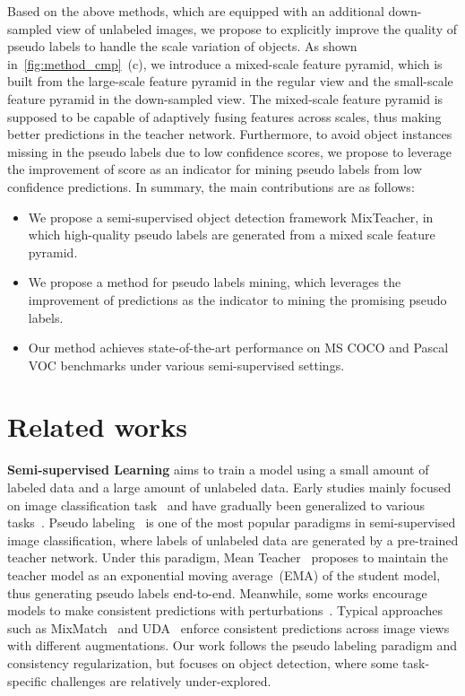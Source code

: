 \documentclass[10pt,twocolumn,letterpaper]{article}
\begin{document}
Based on the above methods, which are equipped with an additional down-sampled view of unlabeled images, we propose to explicitly improve the quality of pseudo labels to handle the scale variation of objects. As shown in~\cref{fig:method_cmp}~(c), we introduce a mixed-scale feature pyramid, which is built from the large-scale feature pyramid in the regular view and the small-scale feature pyramid in the down-sampled view. The mixed-scale feature pyramid is supposed to be capable of adaptively fusing features across scales, thus making better predictions in the teacher network. Furthermore, to avoid object instances missing in the pseudo labels due to low confidence scores, we propose to leverage the improvement of score as an indicator for mining pseudo labels from low confidence predictions. In summary, the main contributions are as follows:
\vspace{-.5em}
\begin{itemize}
    \item We propose a semi-supervised object detection framework MixTeacher, in which high-quality pseudo labels are generated from a mixed scale feature pyramid. 
    \vspace{-.5em}
    \item We propose a method for pseudo labels mining, which leverages the improvement of predictions as the indicator to mining the promising pseudo labels.
    \vspace{-.5em}
    \item Our method achieves state-of-the-art performance on MS COCO and Pascal VOC benchmarks under various semi-supervised settings. 
\end{itemize}






\section{Related works}
\noindent \textbf{Semi-supervised Learning} aims to train a model using a small amount of labeled data and a large amount of unlabeled data. Early studies mainly focused on image classification task~\cite{temporalensembling, Fixmatch} and have gradually been generalized to various tasks~\cite{ouali2020semi,STAC,zhao2020sess}. Pseudo labeling~\cite{pseudo-label1} is one of the most popular paradigms in semi-supervised image classification, where labels of unlabeled data are generated by a pre-trained teacher network. Under this paradigm, Mean Teacher~\cite{MeanTeacher} proposes to maintain the teacher model as an exponential moving average~(EMA) of the student model, thus generating pseudo labels end-to-end. Meanwhile, some works encourage models to make consistent predictions with perturbations~\cite{miyato2018virtual,bachman2014learning,sajjadi2016regularization}. Typical approaches such as MixMatch~\cite{mixmatch} and UDA~\cite{UDA} enforce consistent predictions across image views with different augmentations. Our work follows the pseudo labeling paradigm and consistency regularization, but focuses on object detection, where some task-specific challenges are relatively under-explored.
\end{document}
